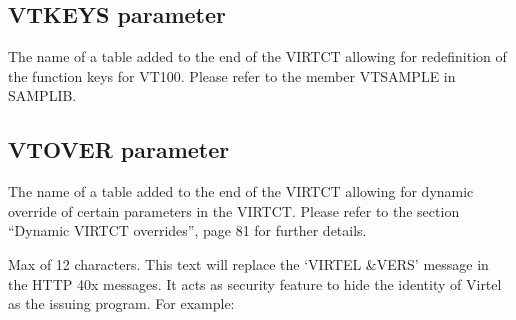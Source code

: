 \documentclass[letterpaper,10pt,english]{sphinxmanual}
\begin{document}
\subsection{VTKEYS parameter}
\label{\detokenize{Installation_Guide:vtkeys-parameter}}\label{\detokenize{Installation_Guide:index-139}}
\begin{sphinxVerbatim}[commandchars=\\\{\}]
 
\end{sphinxVerbatim}

\sphinxAtStartPar
{} \sphinxhyphen{} The name of a table added to the end of the VIRTCT allowing for redefinition of the function keys for VT100. Please refer to the member VTSAMPLE in SAMPLIB.

\ignorespaces 

\subsection{VTOVER parameter}
\label{\detokenize{Installation_Guide:index-140}}\label{\detokenize{Installation_Guide:id7}}
\begin{sphinxVerbatim}[commandchars=\\\{\}]
 
\end{sphinxVerbatim}

\sphinxAtStartPar
{} \sphinxhyphen{} The name of a table added to the end of the VIRTCT allowing for dynamic override of certain parameters in the VIRTCT. Please refer to the section “Dynamic VIRTCT overrides”, page 81 for further details.

\ignorespaces 
\def\sphinxLiteralBlockLabel{\label{\detokenize{Installation_Guide:index-141}}}
\begin{sphinxVerbatim}[commandchars=\\\{\}]
\end{sphinxVerbatim}

\sphinxAtStartPar
Max of 12 characters. This text will replace the ‘VIRTEL \&VERS’ message in the HTTP 40x messages. It acts as security feature to hide the identity of Virtel as the issuing program. For example: \sphinxhyphen{}
\end{document}
